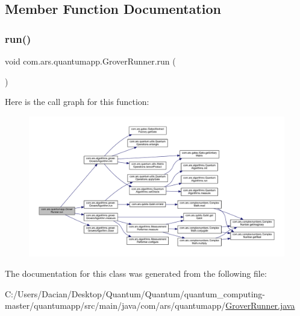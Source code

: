\subsection{Member Function Documentation}
\hypertarget{classcom_1_1ars_1_1quantumapp_1_1_grover_runner_a2524c67bd5ad4b1a33d613a4c12be738}{}\label{classcom_1_1ars_1_1quantumapp_1_1_grover_runner_a2524c67bd5ad4b1a33d613a4c12be738} 
\subsubsection{\texorpdfstring{run()}{run()}}
{\footnotesize\ttfamily void com.\+ars.\+quantumapp.\+Grover\+Runner.\+run (\begin{DoxyParamCaption}{ }\end{DoxyParamCaption})}

Here is the call graph for this function\+:\nopagebreak
\begin{figure}[H]
\begin{center}
\leavevmode
\includegraphics[width=350pt]{classcom_1_1ars_1_1quantumapp_1_1_grover_runner_a2524c67bd5ad4b1a33d613a4c12be738_cgraph}
\end{center}
\end{figure}


The documentation for this class was generated from the following file\+:\begin{DoxyCompactItemize}
\item 
C\+:/\+Users/\+Dacian/\+Desktop/\+Quantum/\+Quantum/quantum\+\_\+computing-\/master/quantumapp/src/main/java/com/ars/quantumapp/\hyperlink{_grover_runner_8java}{Grover\+Runner.\+java}\end{DoxyCompactItemize}
